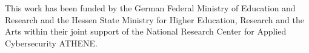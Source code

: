 This work has been funded by the German Federal Ministry of Education and Research and
the Hessen State Ministry for Higher Education, Research and the Arts within their joint support of
the National Research Center for Applied Cybersecurity ATHENE.